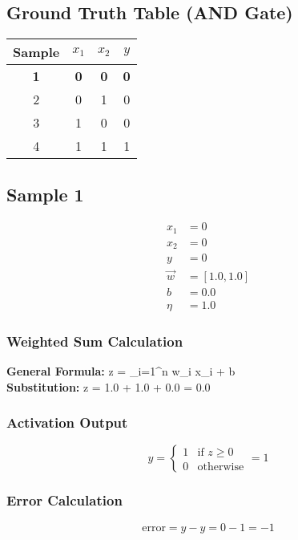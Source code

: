 \documentclass{article}
\begin{document}
\subsection*{Ground Truth Table (AND Gate)}
\begin{center}
\begin{tabular}{|c|c|c|c|}
\hline
\textbf{Sample} & $x_1$ & $x_2$ & $y$ \\
\hline
\rowcolor{yellow} \textbf{1} & \textbf{0} & \textbf{0} & \textbf{0} \\
\hline
2 & 0 & 1 & 0 \\
\hline
3 & 1 & 0 & 0 \\
\hline
4 & 1 & 1 & 1 \\
\hline
\end{tabular}
\end{center}

\subsection*{Sample 1}
\begin{align*}
x_1 &= 0 \\
x_2 &= 0 \\
y &= 0 \\
\vec{w} &= [1.0, 1.0] \\
b &= 0.0 \\
\eta &= 1.0
\end{align*}

\subsubsection*{Weighted Sum Calculation}
\textbf{General Formula:} \quad
z = \sum_{i=1}^{n} w_i x_i + b
\\
\textbf{Substitution:} \quad
z = 1.0  + 1.0  + 0.0 = 0.0

\subsubsection*{Activation Output}
\[
\hat{y} =
\begin{cases}
1 & \text{if } z \geq 0 \\
0 & \text{otherwise}
\end{cases}
= 1
\]

\subsubsection*{Error Calculation}
\[
\text{error} = y - \hat{y} = 0 - 1 = -1
\]
\end{document}
